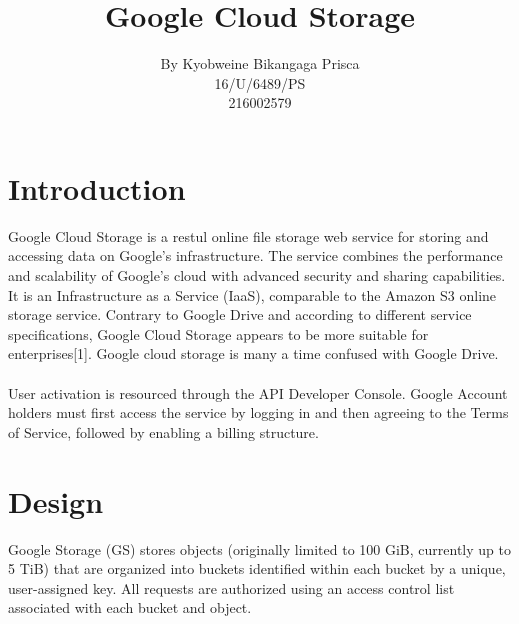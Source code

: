 \documentclass[]{report}
\title{Google Cloud Storage}
\author{ By Kyobweine Bikangaga Prisca\\
16/U/6489/PS\\
216002579}
\begin{document}
\maketitle

\section{Introduction}
Google Cloud Storage is a restul online file storage web service for storing and accessing data on Google's infrastructure. The service combines the performance and scalability of Google's cloud with advanced security and sharing capabilities. It is an Infrastructure as a Service (IaaS), comparable to the Amazon S3 online storage service. Contrary to Google Drive and according to different service specifications, Google Cloud Storage appears to be more suitable for enterprises[1]. Google cloud storage is many a time confused with Google Drive.\\
\\
User activation is resourced through the API Developer Console. Google Account holders must first access the service by logging in and then agreeing to the Terms of Service, followed by enabling a billing structure.\\
\section{Design} Google Storage (GS) stores objects (originally limited to 100 GiB, currently up to 5 TiB) that are organized into buckets identified within each bucket by a unique, user-assigned key. All requests are authorized using an access control list associated with each bucket and object.
\\
\end{document}
